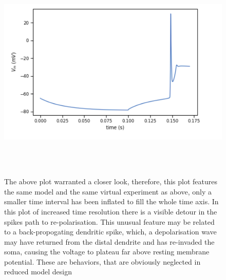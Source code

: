 \begin{figure}
 \begin{center}
    \includegraphics[scale=0.8]{figures/spike_shape.png}
    \caption[Complex spike in the L5PC model]{The above plot warranted a closer look, therefore, this plot features the same model and the same virtual experiment as above, only a smaller time interval has been inflated to fill the whole time axis. In this plot of increased time resolution there is a visible detour in the spikes path to re-polarisation. This unusual feature may be related to a back-propogating dendritic spike, which, a depolarisation wave may have returned from the distal dendrite and has re-invaded the soma, causing the voltage to plateau far above resting membrane potential. These are behaviors, that are obviously neglected in reduced model design}
  \label{fig:sub1}
  \end{center}
\end{figure}

